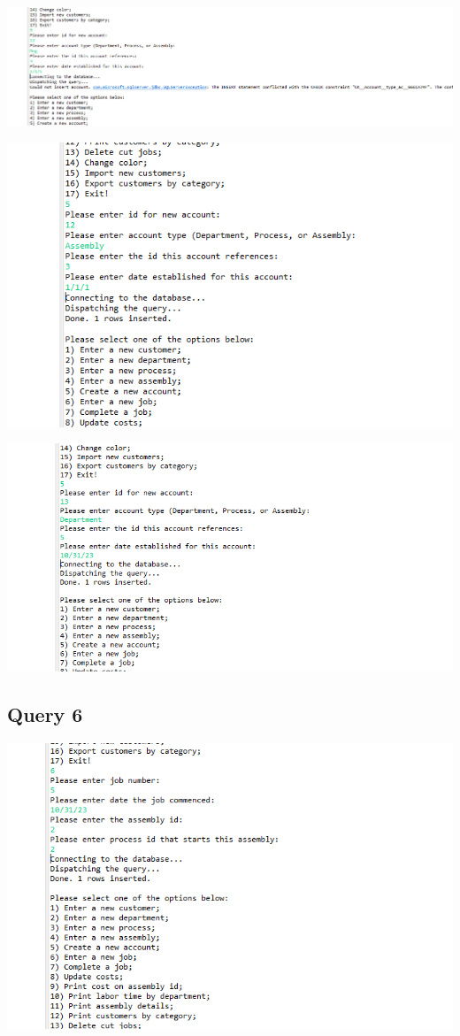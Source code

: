\documentclass[11pt]{article}
\begin{document}
\includegraphics[width = \textwidth]{acct3.png}

\includegraphics[width = \textwidth]{acct4.png}

\includegraphics[width = \textwidth]{acct5.png}
\subsection{Query 6}

\includegraphics[width = \textwidth]{job1.png}
\end{document}
